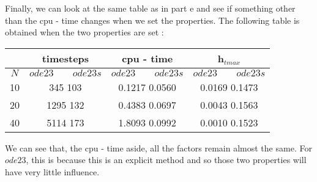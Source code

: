 Finally, we can look at the same table as in part e and see if something other than the cpu - time changes when we set the properties. The following table is obtained when the two properties are set : 

\begin{center}
\begin{tabular}{|c|c|c|c|}
\hline 
  & \textbf{timesteps} & \textbf{cpu - time} & \textbf{h}$_{tmax}$ \\ 
\hline 
$N$ & $ode23 \phantom{fedz} ode23s$ & $ode23 \phantom{fedz} ode23s$ & $ode23 \phantom{fedz} ode23s$ \\ 
\hline 
10 &345 \phantom{fedzf} 103  & 0.1217 \phantom{fedz}    0.0560 &  0.0169  \phantom{fedz}  0.1473 \\ 
\hline 
20 & 1295 \phantom{fedz} 132 & 0.4383  \phantom{fedz}   0.0697 & 0.0043  \phantom{fedz}  0.1563 \\ 
\hline 
40 & 5114 \phantom{fedz} 173 &1.8093 \phantom{fedz}   0.0992  & 0.0010  \phantom{fedz}  0.1523 \\ 
\hline 
\end{tabular} 
\end{center}

We can see that, the cpu - time aside, all the factors remain almost the same. For $ode23$, this is because this is an explicit method and so those two properties will have very little influence. 